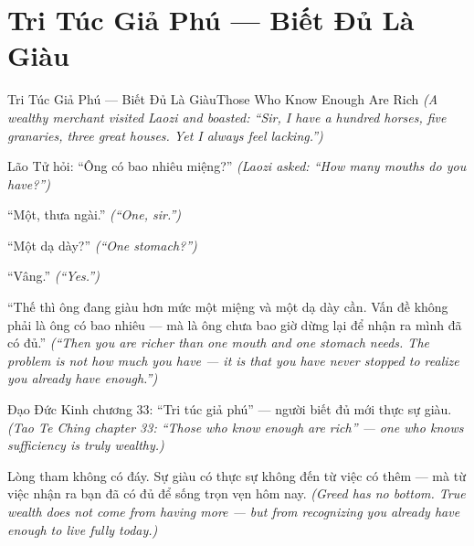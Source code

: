 \section{Tri Túc Giả Phú — Biết Đủ Là Giàu}
\begin{truyen}{Tri Túc Giả Phú — Biết Đủ Là Giàu}{Those Who Know Enough Are Rich}
\textit{(A wealthy merchant visited Laozi and boasted: ``Sir, I have a hundred horses, five granaries, three great houses. Yet I always feel lacking.'')}

Lão Tử hỏi: ``Ông có bao nhiêu miệng?''
\textit{(Laozi asked: ``How many mouths do you have?'')}

``Một, thưa ngài.''
\textit{(``One, sir.'')}

``Một dạ dày?''
\textit{(``One stomach?'')}

``Vâng.''
\textit{(``Yes.'')}

``Thế thì ông đang giàu hơn mức một miệng và một dạ dày cần. Vấn đề không phải là ông có bao nhiêu — mà là ông chưa bao giờ dừng lại để nhận ra mình đã có đủ.''
\textit{(``Then you are richer than one mouth and one stomach needs. The problem is not how much you have — it is that you have never stopped to realize you already have enough.'')}

Đạo Đức Kinh chương 33: ``Tri túc giả phú'' — người biết đủ mới thực sự giàu.
\textit{(Tao Te Ching chapter 33: ``Those who know enough are rich'' — one who knows sufficiency is truly wealthy.)}

\end{truyen}

\begin{baihoc}
Lòng tham không có đáy. Sự giàu có thực sự không đến từ việc có thêm — mà từ việc nhận ra bạn đã có đủ để sống trọn vẹn hôm nay.
\textit{(Greed has no bottom. True wealth does not come from having more — but from recognizing you already have enough to live fully today.)}
\end{baihoc}
\ngancach

